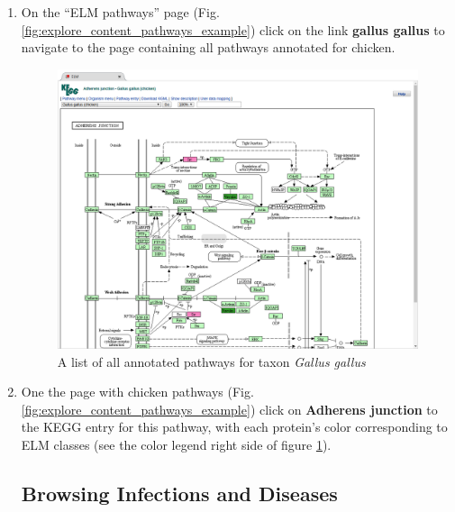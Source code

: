 \documentclass[12pt]{article}
\newcommand\button[1]{%
	\textbf{#1}{}%
}
\begin{document}
\begin{enumerate}
\item On the ``ELM pathways'' page
	(Fig.  \ref{fig:explore_content_pathways_example})
	click on the link \button{gallus gallus} to navigate to the page
	containing all pathways annotated for
	chicken.

\begin{figure}[h!]
	\centering
	\includegraphics[width=\textwidth]{Figures/explore_content/pathways_kegg.png} 
	\caption{
	A list of all annotated pathways for taxon \textit{Gallus gallus}
	}
	\label{fig:explore_content_pathways_kegg}
\end{figure}

\item One the page with chicken pathways
	(Fig. \ref{fig:explore_content_pathways_example})
	click on \button{Adherens junction} to the KEGG entry for this pathway,
	with each protein's color corresponding to ELM classes (see the color
	legend right side of figure \ref{fig:explore_content_pathways_kegg}).

%
%
\subsection*{Browsing Infections and Diseases}
\label{subsec:explore_content_infections_and_diseases}


\end{enumerate}
\end{document}
